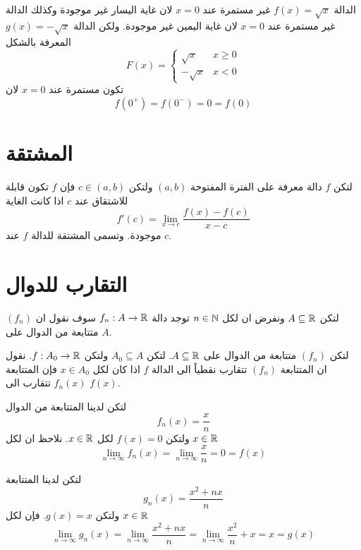 \begin{example}
الدالة $f(x) = \sqrt{x}$ غير مستمرة عند $x=0$ لان غاية اليسار غير موجودة وكذلك الدالة \\$ g(x) =- \sqrt{x}$ غير مستمرة عند $x=0$ لان غاية اليمين غير موجودة. ولكن الدالة المعرفة بالشكل
\[
F(x) = \begin{cases}
	\sqrt{x} & x\geq0 \\
	-\sqrt{x} & x < 0
\end{cases}
\]
تكون مستمرة عند $x=0$ لان
\[
f(0^+) = f(0^-) = 0 = f(0)
\]

\begin{figure}[H]
	\centering
\end{figure}
\end{example}
\newpage
\section[المشتقة]{المشتقة \cite{realanal}}
\begin{definition}
	لتكن $f$ دالة معرفة على الفترة المفتوحة $(a, b)$ ولتكن $c\in (a, b)$ فإن $f$ تكون قابلة للاشتقاق عند $c$ اذا كانت الغاية
	\[
	f'(c) = \lim\limits_{x\to c} \frac{f(x) - f(c)}{x-c} 
	\]
	موجودة. وتسمى المشتقة للدالة $f$ عند $c$.
\end{definition}


\section[التقارب للدوال]{التقارب للدوال \cite{elemrealanal}} 
لتكن $A\subseteq\mathbb{R}$ ونفرض ان لكل $n\in\mathbb{N}$ توجد دالة $f_n:A\to\mathbb{R}$ سوف نقول ان $(f_n)$ متتابعة من الدوال على $A$.
\begin{definition}
 	لتكن $(f_n)$ متتابعة من الدوال على $A\subseteq\mathbb{R}$. لتكن $A_0\subseteq A$ ولتكن $f:A_0\to\mathbb{R}$. نقول ان المتتابعة $(f_n)$ تتقارب نقطياً الى الدالة $f$ اذا كان لكل $x\in A_0 $ فإن المتتابعة $f_n(x)$ تتقارب الى $f(x)$.
\end{definition}

\begin{example}
	 لتكن لدينا المتتابعة من الدوال
	\[
	f_n(x) = \frac{x}{n}
	\]
	ولتكن $f(x) = 0$ لكل $x\in \mathbb{R}$. نلاحظ ان لكل $x\in \mathbb{R}$
	\[
	\lim\limits_{n\to \infty}f_n(x)  = \lim\limits_{n\to \infty}\frac{x}{n} = 0 = f(x)
	\]
	\end{example}
\begin{example}
لتكن لدينا المتتابعة 
	\[
	g_n(x) = \frac{x^2 + nx}{n}
	\]
	ولتكن $g(x) = x$. فإن لكل $x\in\mathbb{R}$
	\[
	\lim\limits_{n\to \infty}g_n(x)  = \lim\limits_{n\to \infty}\frac{x^2+nx}{n} = \lim\limits_{n\to \infty}\frac{x^2}{n} + x = x = g(x)
	\]
\end{example}

